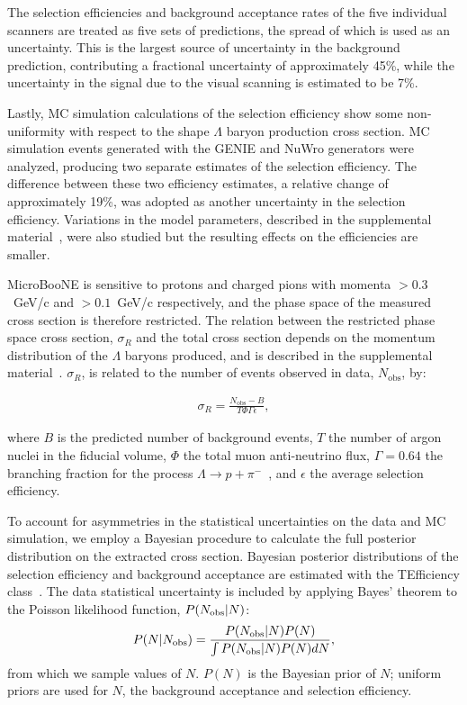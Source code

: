 \documentclass[aps,prl,twocolumn,superscriptaddress]{revtex4}
\begin{document}
The selection efficiencies and background acceptance rates of the five individual scanners are treated as five sets of predictions, the spread of which is used as an uncertainty. This is the largest source of uncertainty in the background prediction, contributing a fractional uncertainty of approximately 45\%, while the uncertainty in the signal due to the visual scanning is estimated to be 7\%.

Lastly, MC simulation calculations of the selection efficiency show some non-uniformity with respect to the shape $\Lambda$ baryon production cross section. MC simulation events generated with the GENIE and NuWro generators were analyzed, producing two separate estimates of the selection efficiency. The difference between these two efficiency estimates, a relative change of approximately 19\%, was adopted as another uncertainty in the selection efficiency. Variations in the model parameters, described in the supplemental material~\cite{SupplementalMaterial}, were also studied but the resulting effects on the efficiencies are smaller.

MicroBooNE is sensitive to protons and charged pions with momenta $> 0.3$~GeV/c and $>0.1$~GeV/c respectively, and the phase space of the measured cross section is therefore restricted. The relation between the restricted phase space cross section, $\sigma_R$ and the total cross section depends on the momentum distribution of the $\Lambda$ baryons produced, and is described in the supplemental material~\cite{SupplementalMaterial}. $\sigma_R$, is related to the number of events observed in data, $N_{\textrm{obs}}$, by:

\begin{align}
\sigma_R = \frac{N_{\textrm{obs}} - B}{T\Phi\Gamma\epsilon},
\end{align}

\noindent where $B$ is the predicted number of background events, $T$ the number of argon nuclei in the fiducial volume, $\Phi$ the total muon anti-neutrino flux, $\Gamma = 0.64$ the branching fraction for the process $\Lambda \to p + \pi^-$~\cite{ParticleDataGroup:2020ssz}, and $\epsilon$ the average selection efficiency. 

To account for asymmetries in the statistical uncertainties on the data and MC simulation, we employ a Bayesian procedure to calculate the full posterior distribution on the extracted cross section. Bayesian posterior distributions of the selection efficiency and background acceptance are estimated with the TEfficiency class~\cite{TEfficiency}. The data statistical uncertainty is included by applying Bayes' theorem to the Poisson likelihood function, $P(N_{\rm obs}|N)$:
%
\begin{equation}
P(N|N_{\rm obs}) = \frac{P(N_{\rm obs}|N)P(N)}{\int P(N_{\textrm{obs}}|N)P(N)dN},
\end{equation}
%
from which we sample values of $N$. $P(N)$ is the Bayesian prior of $N$; uniform priors are used for $N$, the background acceptance and selection efficiency.
\end{document}
